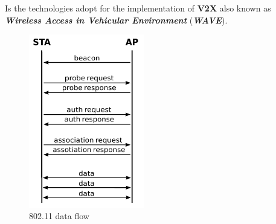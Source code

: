 Is the technologies adopt for the implementation of \textbf{V2X} also known as \textbf{\textit{Wireless Access in Vehicular Environment}} (\textbf{\textit{WAVE}}).

\begin{figure}[h]
    \centering
    \begin{minipage}[t]{0.45\textwidth}
        \centering
        \includegraphics[width=0.45\textwidth]{img/11a}
        \caption{802.11 data flow}
        \label{fig:11a}
        

\end{minipage}
\end{figure}

